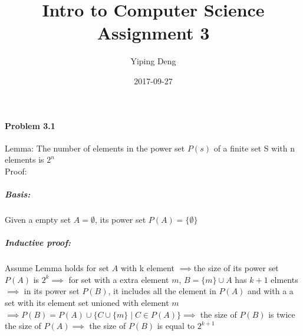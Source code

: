 \documentclass{article}
\title{Intro to Computer Science Assignment 3}
\date{2017-09-27}
\author{Yiping Deng}
\begin{document}
\maketitle
\paragraph{Problem 3.1}
Lemma: The number of elements in the power set $P(s)$ of a finite set S with n elements is $2^n$ \\
Proof:\\
\subparagraph{Basis:} Given a empty set $A = \emptyset $, its power set $P(A) = \{ \emptyset \}$
\subparagraph{Inductive proof:} Assume Lemma holds for set $A$ with k element
$\implies $the size of its power set $P(A)$ is $ 2^k \implies $
for set with a extra element $m$, $ B = \{ m \} \cup A $ has $ k + 1 $ elments $\implies $
in its power set $P(B)$, it includes all the element in $P(A) $ and with a a set with its element set unioned with element $m$
$ \implies P(B) = P(A) \cup \{ C \cup \{ m \} \mid C \in P(A) \} \implies$ the size of $P(B)$ is twice the size of $P(A) \implies$ the size of $P(B)$ is equal to $2^{k + 1}$
\end{document}
